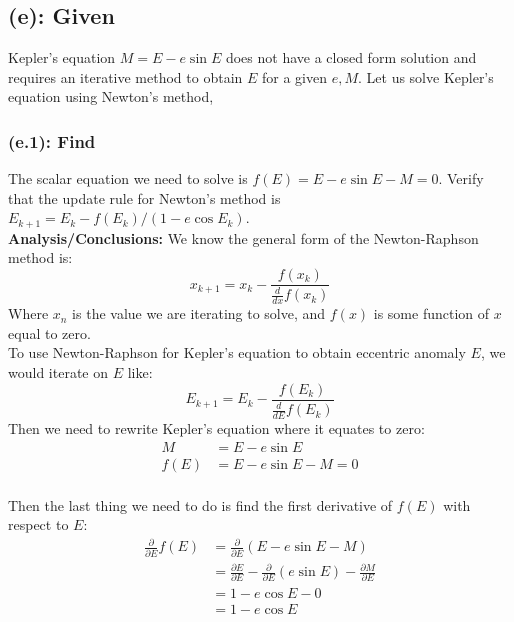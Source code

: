 \documentclass[titlepage]{article}
\begin{document}
\subsection*{(e): Given}
Kepler's equation $M=E-e\sin E$ does not have a closed form solution and requires an iterative method to obtain $E$ for a given $e, M$. Let us solve Kepler's equation using Newton's method,

\subsubsection*{(e.1): Find}
The scalar equation we need to solve is $f(E)=E-e\sin E-M=0$. Verify that the update rule for Newton's method is $E_{k+1}=E_k-f(E_k)/(1-e\cos E_k)$.\\

\textbf{Analysis/Conclusions:}
We know the general form of the Newton-Raphson method is:
\begin{equation}
	x_{k+1}=x_k-\frac{f(x_k)}{\frac{d}{dx}f(x_k)}
\end{equation}
Where $x_n$ is the value we are iterating to solve, and $f(x)$ is some function of $x$ equal to zero.\\

To use Newton-Raphson for Kepler's equation to obtain eccentric anomaly $E$, we would iterate on $E$ like:
\begin{equation}
	E_{k+1}=E_k-\frac{f(E_k)}{\frac{d}{dE}f(E_k)}
\end{equation}
Then we need to rewrite Kepler's equation where it equates to zero:
\begin{equation}
	\begin{split}
		M&=E-e\sin E\\
		f(E)&=E-e\sin E-M=0\\
	\end{split}
\end{equation}

Then the last thing we need to do is find the first derivative of $f(E)$ with respect to $E$:
\begin{equation}
	\begin{split}
		\frac{\partial}{\partial E}f(E)&=\frac{\partial}{\partial E}\left(E-e\sin E-M\right)\\
		&=\frac{\partial E}{ \partial E}-\frac{\partial}{\partial E}\left(e\sin E\right)-\frac{\partial M}{\partial E}\\
		&=1-e\cos E-0\\
		&=1-e\cos E\\
	\end{split}
\end{equation}
\end{document}
